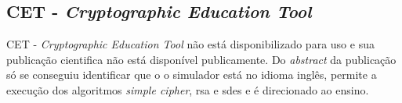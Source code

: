 
\subsection{CET - \textit{Cryptographic Education Tool}}
CET - \textit{Cryptographic Education Tool} \cite{abuzaid11} não está disponibilizado para uso e sua publicação cientifica não está disponível publicamente. Do \textit{abstract} da publicação só se conseguiu identificar que o o simulador está no idioma inglês, permite a execução dos algoritmos \textit{simple cipher}, \acrshort{rsa} e \acrshort{sdes} e é direcionado ao ensino.




